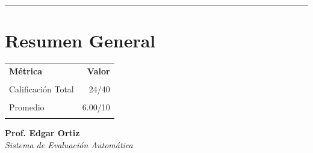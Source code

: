 \documentclass[11pt]{article}
\begin{document}
\vspace{0.5cm}
\hrule
\vspace{0.5cm}


\section*{\textbf{Resumen General}}

\begin{center}
\begin{tabular}{l r}
\toprule
\textbf{Métrica} & \textbf{Valor} \\\\
\midrule
Calificación Total & 24/40 \\\\
Promedio & 6.00/10 \\\\
\bottomrule
\end{tabular}
\end{center}

\vspace{1cm}
\begin{center}
\textbf{Prof. Edgar Ortiz}\\[0.2cm]
\small\textit{Sistema de Evaluación Automática}
\end{center}

\vfill
\vspace{3cm}
\end{document}
